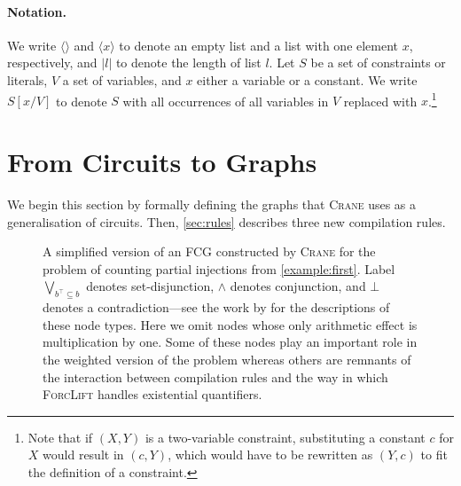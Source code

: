 \documentclass[letterpaper]{article} %
\DeclareMathOperator{\CR}{\textsc{CR}}
\DeclareMathOperator{\GDR}{\textsc{GDR}}
\DeclareMathOperator{\Reff}{\textsc{Ref}}
\theoremstyle{definition}
\theoremstyle{remark}
\begin{document}
\paragraph*{Notation.}
We write $\langle\rangle$ and $\langle x \rangle$ to denote an empty list and a
list with one element $x$, respectively, and $|l|$ to denote the length of list
$l$. Let $S$ be a set of constraints or literals, $V$ a set of variables, and
$x$ either a variable or a constant. We write $S[x/V]$ to denote $S$ with all
occurrences of all variables in $V$ replaced with $x$.\footnote{Note that if
  $(X, Y)$ is a two-variable constraint, substituting a constant $c$ for $X$
  would result in $(c, Y)$, which would have to be rewritten as $(Y, c)$ to fit
  the definition of a constraint.}

\section{From Circuits to Graphs}\label{sec:methods}


We begin this section by formally defining the graphs that \textsc{Crane} uses
as a generalisation of circuits. Then, \cref{sec:rules} describes three new
compilation rules.

\begin{figure}[t]
  \centering
  \caption{A simplified version of an FCG constructed by \textsc{Crane} for the
    problem of counting partial injections from \cref{example:first}. Label
    $\bigvee_{b^\top \subseteq b}$ denotes set-disjunction, $\land$ denotes
    conjunction, and $\bot$ denotes a contradiction---see the work by
    \citet{DBLP:conf/ijcai/BroeckTMDR11} for the descriptions of these node
    types. Here we omit nodes whose only arithmetic effect is multiplication by
    one. Some of these nodes play an important role in the weighted version of
    the problem whereas others are remnants of the interaction between
    compilation rules and the way in which \textsc{ForcLift} handles existential
    quantifiers.}\label{fig:examplefcg}
\end{figure}
\end{document}

